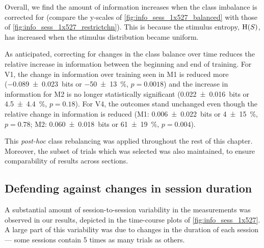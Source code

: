 Overall, we find the amount of information increases when the class imbalance is corrected for (compare the y-scales of \autoref{fig:info_sess_1x527_balanced} with those of \autoref{fig:info_sess_1x527_restrictchn}).
This is because the stimulus entropy, $\operatorname{H}(S)$, has increased when the stimulus distribution became uniform.

As anticipated, correcting for changes in the class balance over time reduces the relative increase in information between the beginning and end of training.
For \ac{V1}, the change in information over training seen in \ac{M1} is reduced more (\SI{-0.089\pm0.023}{bits} or \SI{-50\pm13}{\percent}, $p=0.0018$) and the increase in information for \ac{M2} is no longer statistically significant (\SI{+0.022\pm0.016}{bits} or \SI{+4.5\pm4.4}{\percent}, $p=0.18$).
For \ac{V4}, the outcomes stand unchanged even though the relative change in information is reduced
(\ac{M1}: \SI{+0.006\pm0.022}{bits} or \SI{+4\pm15}{\percent}, $p=0.78$; \ac{M2}: \SI{+0.060\pm0.018}{bits} or \SI{+61\pm19}{\percent}, $p=0.004$).

This \textit{post-hoc} class rebalancing was applied throughout the rest of this chapter.
Moreover, the subset of trials which was selected was also maintained, to ensure comparability of results across sections.


\subsection{Defending against changes in session duration}

A substantial amount of session-to-session variability in the measurements was observed in our results, depicted in the time-course plots of \autoref{fig:info_sess_1x527}.
A large part of this variability was due to changes in the duration of each session --- some sessions contain \num{5} times as many trials as others.

